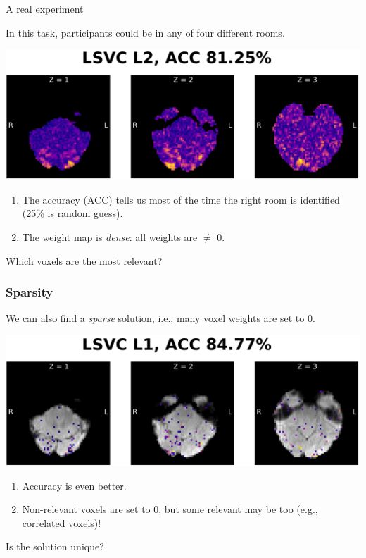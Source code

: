 \documentclass[11pt]{beamer}
\begin{document}
\begin{frame}[squeeze]{A real experiment}

    In this task, participants could be in any of four different rooms.

    \vspace*{-1cm}

    \begin{center}
        \includegraphics[scale=0.7]{figures/lsvc_l2-axial.png}
    \end{center}

    \begin{enumerate}
        \item The accuracy (ACC) tells us most of the time the right room is
            identified (25\% is random guess).
        \item The weight map is \emph{dense}: all weights are $\neq$ 0.
    \end{enumerate}

    Which voxels are the most relevant?

\end{frame}
\begin{frame}
    \frametitle{Sparsity}

    We can also find a \emph{sparse} solution, i.e., many voxel weights are set
    to 0.
    
    \vspace*{-1cm}

    \begin{center}
        \includegraphics[scale=0.7]{figures/lsvc_l1-axial.png}
    \end{center}

    \begin{enumerate}
        \item Accuracy is even better.
        \item Non-relevant voxels are set to 0, but some relevant may be too
            (e.g., correlated voxels)!
    \end{enumerate}

    Is the solution unique?

\end{frame}
\end{document}
